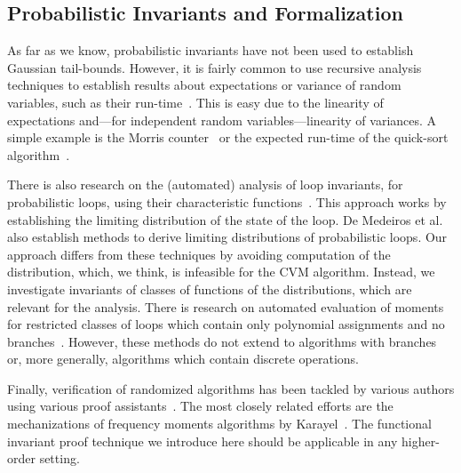 \subsection{Probabilistic Invariants and Formalization}
As far as we know, probabilistic invariants have not been used to establish Gaussian tail-bounds.
However, it is fairly common to use recursive analysis techniques to establish results about expectations or variance of random variables, such as their run-time~\cite[Section 1.4]{motwani1995}.
This is easy due to the linearity of expectations and---for independent random variables---linearity of variances.
A simple example is the Morris counter~\cite{morris1978} or the expected run-time of the quick-sort algorithm~\cite[Section 2.5]{mitzenmacher2005}.

There is also research on the (automated) analysis of loop invariants, for probabilistic loops, using their characteristic functions~\cite{batz2023, mciver2005}.
This approach works by establishing the limiting distribution of the state of the loop.
De Medeiros et al.~\cite[Section 3.2]{demedeiros2024} also establish methods to derive limiting distributions of probabilistic loops.
Our approach differs from these techniques by avoiding computation of the distribution, which, we think, is infeasible for the CVM algorithm.
Instead, we investigate invariants of classes of functions of the distributions, which are relevant for the analysis.
There is research on automated evaluation of moments for restricted classes of loops which contain only polynomial assignments and no branches~\cite{bartocci2019,kofnov2022}.
However, these methods do not extend to algorithms with branches or, more generally, algorithms which contain discrete operations.

Finally, verification of randomized algorithms has been tackled by various authors using various proof assistants~\cite{bosshard2024,demedeiros2024, eberl2020,gopinathan20,hurd03, Probabilistic_Prime_Tests-AFP, tan2024}.
The most closely related efforts are the mechanizations of frequency moments algorithms by Karayel~\cite{karayel2022, karayel2023}.
The functional invariant proof technique we introduce here should be applicable in any higher-order setting.

